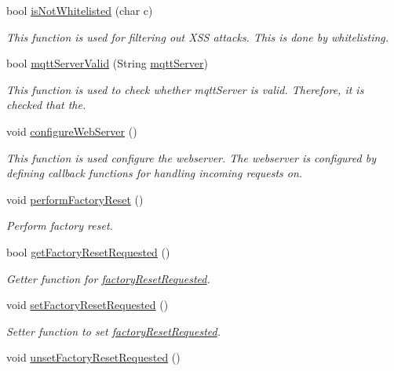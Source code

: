 \begin{DoxyCompactItemize}
bool \hyperlink{WIFIOnOff_8ino_a3523db85b2f83ce089a2a733d7a025ad}{is\-Not\-Whitelisted} (char c)
\begin{DoxyCompactList}\small\item\em This function is used for filtering out X\-S\-S attacks. This is done by whitelisting. \end{DoxyCompactList}\item 
bool \hyperlink{WIFIOnOff_8ino_a3251df1e6168789bae584b4063d5a59d}{mqtt\-Server\-Valid} (String \hyperlink{WIFIOnOff_8ino_a020889fcca6224d14f4d3f4241ca4467}{mqtt\-Server})
\begin{DoxyCompactList}\small\item\em This function is used to check whether mqtt\-Server is valid. Therefore, it is checked that the. \end{DoxyCompactList}\item 
void \hyperlink{WIFIOnOff_8ino_a50409543b7c4c4fb48e60ec35fbda3f3}{configure\-Web\-Server} ()
\begin{DoxyCompactList}\small\item\em This function is used configure the webserver. The webserver is configured by defining callback functions for handling incoming requests on. \end{DoxyCompactList}\item 
void \hyperlink{WIFIOnOff_8ino_afec1c2962185272a8c87843f95d205ad}{perform\-Factory\-Reset} ()
\begin{DoxyCompactList}\small\item\em Perform factory reset. \end{DoxyCompactList}\item 
bool \hyperlink{WIFIOnOff_8ino_a3e9603214a47595af27b6e16f635734d}{get\-Factory\-Reset\-Requested} ()
\begin{DoxyCompactList}\small\item\em Getter function for \hyperlink{WIFIOnOff_8ino_a4768e99cded5c5493ba789b0555c80fc}{factory\-Reset\-Requested}. \end{DoxyCompactList}\item 
void \hyperlink{WIFIOnOff_8ino_a974b42331b531d9c0ec0d5be4d745078}{set\-Factory\-Reset\-Requested} ()
\begin{DoxyCompactList}\small\item\em Setter function to set \hyperlink{WIFIOnOff_8ino_a4768e99cded5c5493ba789b0555c80fc}{factory\-Reset\-Requested}. \end{DoxyCompactList}\item 
void \hyperlink{WIFIOnOff_8ino_a1da84f44cf0a8afe3ad725de0cae4c19}{unset\-Factory\-Reset\-Requested} ()

\end{DoxyCompactItemize}
